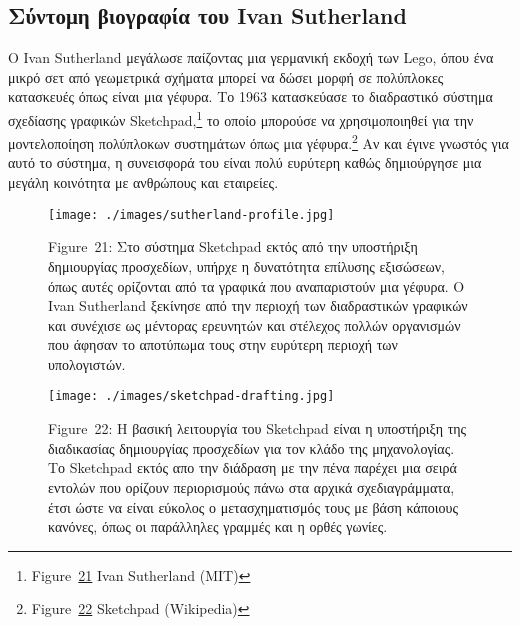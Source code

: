 \documentclass[
]{article}
\begin{document}
\hypertarget{ux3c3ux3cdux3bdux3c4ux3bfux3bcux3b7-ux3b2ux3b9ux3bfux3b3ux3c1ux3b1ux3c6ux3afux3b1-ux3c4ux3bfux3c5-ivan-sutherland}{%
\subsection{Σύντομη βιογραφία του Ivan
Sutherland}\label{ux3c3ux3cdux3bdux3c4ux3bfux3bcux3b7-ux3b2ux3b9ux3bfux3b3ux3c1ux3b1ux3c6ux3afux3b1-ux3c4ux3bfux3c5-ivan-sutherland}}

Ο Ivan Sutherland μεγάλωσε παίζοντας μια γερμανική εκδοχή των Lego, όπου
ένα μικρό σετ από γεωμετρικά σχήματα μπορεί να δώσει μορφή σε πολύπλοκες
κατασκευές όπως είναι μια γέφυρα. Το 1963 κατασκεύασε το διαδραστικό
σύστημα σχεδίασης γραφικών Sketchpad,\footnote{Figure~\protect\hyperlink{fig:sutherland-profile}{21}
  Ivan Sutherland (MIT)} το οποίο μπορούσε να χρησιμοποιηθεί για την
μοντελοποίηση πολύπλοκων συστημάτων όπως μια γέφυρα.\footnote{Figure~\protect\hyperlink{fig:sketchpad-drafting}{22}
  Sketchpad (Wikipedia)} Αν και έγινε γνωστός για αυτό το σύστημα, η
συνεισφορά του είναι πολύ ευρύτερη καθώς δημιούργησε μια μεγάλη
κοινότητα με ανθρώπους και εταιρείες.

\leavevmode{}%
\begin{figure}
\hypertarget{fig:sutherland-profile}{%
\centering
\texttt{[image: ./images/sutherland-profile.jpg]}
\caption{Figure~21: Στο σύστημα Sketchpad εκτός από την υποστήριξη
δημιουργίας προσχεδίων, υπήρχε η δυνατότητα επίλυσης εξισώσεων, όπως
αυτές ορίζονται από τα γραφικά που αναπαριστούν μια γέφυρα. O Ivan
Sutherland ξεκίνησε από την περιοχή των διαδραστικών γραφικών και
συνέχισε ως μέντορας ερευνητών και στέλεχος πολλών οργανισμών που άφησαν
το αποτύπωμα τους στην ευρύτερη περιοχή των
υπολογιστών.}\label{fig:sutherland-profile}
}
\end{figure}

\leavevmode{}%
\begin{figure}
\hypertarget{fig:sketchpad-drafting}{%
\centering
\texttt{[image: ./images/sketchpad-drafting.jpg]}
\caption{Figure~22: Η βασική λειτουργία του Sketchpad είναι η υποστήριξη
της διαδικασίας δημιουργίας προσχεδίων για τον κλάδο της μηχανολογίας.
Το Sketchpad εκτός απο την διάδραση με την πένα παρέχει μια σειρά
εντολών που ορίζουν περιορισμούς πάνω στα αρχικά σχεδιαγράμματα, έτσι
ώστε να είναι εύκολος ο μετασχηματισμός τους με βάση κάποιους κανόνες,
όπως οι παράλληλες γραμμές και η ορθές
γωνίες.}\label{fig:sketchpad-drafting}
}
\end{figure}
\end{document}
